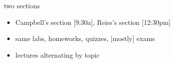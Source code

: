 \begin{frame}{two sections}
    \begin{itemize}
    \item Campbell's section [9:30a], Reiss's section [12:30pm]
    \item same labs, homeworks, quizzes, [mostly] exams
    \item lectures alternating by topic
    \end{itemize}
\end{frame}
